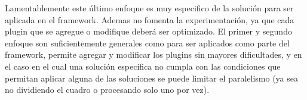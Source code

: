 Lamentablemente este último enfoque es muy especifico de la solución para ser
aplicada en el framework. Ademas no fomenta la experimentación, ya que cada
plugin que se agregue o modifique deberá ser optimizado. El primer y segundo
enfoque son suficientemente generales como para ser aplicados como parte del
framework, permite agregar y modificar los plugins sin mayores dificultades, y
en el caso en el cual una solución especifica no cumpla con las condiciones que
permitan aplicar alguna de las soluciones se puede limitar el paralelismo (ya
sea no dividiendo el cuadro o procesando solo uno por vez).
